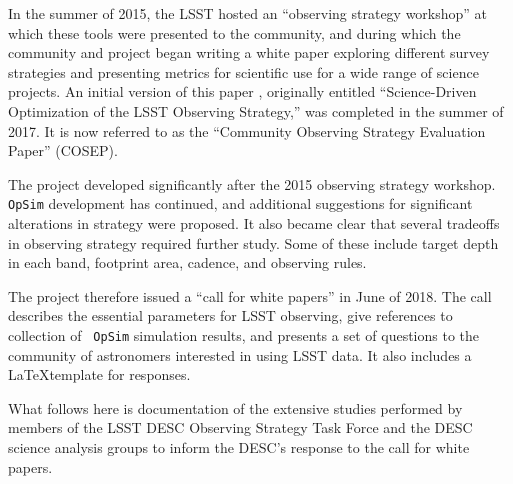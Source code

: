 In the summer of 2015, the LSST hosted an ``observing strategy
workshop'' at which these tools were presented to the community, and
during which the community and project began writing a white paper
exploring different survey strategies and presenting metrics for
scientific use for a wide range of science projects. An initial
version of this paper \citep{2017arXiv170804058L}, originally entitled
``Science-Driven Optimization of the LSST Observing Strategy,'' was
completed in the summer of 2017. It is now referred to as the
``Community Observing Strategy Evaluation Paper'' (COSEP).

The project developed significantly after the 2015 observing
strategy workshop. {\tt OpSim} development has continued, and
additional suggestions for significant alterations in strategy were
proposed. It also became clear that several tradeoffs in observing
strategy required further study. Some of these include target depth in
each band, footprint area, cadence, and observing rules.

The project therefore issued a ``call for white papers'' in June of
2018\citep{ivezic_call_2018}. The call describes the essential
parameters for LSST observing, give references to collection of {\tt
  OpSim} simulation results, and presents a set of questions to the
community of astronomers interested in using LSST data. It also
includes a \LaTeX template for responses.

What follows here is documentation of the extensive studies performed
by members of the LSST DESC Observing Strategy Task Force and the DESC
science analysis groups to inform the DESC's response to the call for
white papers.
